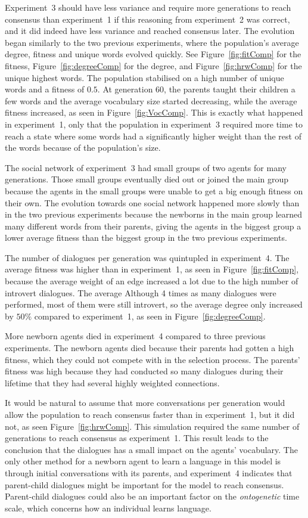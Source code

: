Experiment~3 should have less variance and require more generations to reach consensus than experiment~1 if this reasoning from experiment~2 was correct, and it did indeed have less variance and reached consensus later. The evolution began similarly to the two previous experiments, where the population's average degree, fitness and unique words evolved quickly. See Figure~\ref{fig:fitComp} for the fitness, Figure~\ref{fig:degreeComp} for the degree, and Figure~\ref{fig:hrwComp} for the unique highest words. The population stabilised on a high number of unique words and a fitness of $0.5$. At generation $60$, the parents taught their children a few words and the average vocabulary size started decreasing, while the average fitness increased, as seen in Figure~\ref{fig:VocComp}. This is exactly what happened in experiment~1, only that the population in experiment~3 required more time to reach a state where some words had a significantly higher weight than the rest of the words because of the population’s size. 

The social network of experiment~3 had small groups of two agents for many generations. Those small groups eventually died out or joined the main group because the agents in the small groups were unable to get a big enough fitness on their own. The evolution towards one social network happened more slowly than in the two previous experiments because the newborns in the main group learned many different words from their parents, giving the agents in the biggest group a lower average fitness than the biggest group in the two previous experiments.

The number of dialogues per generation was quintupled in experiment~4. The average fitness was higher than in experiment~1, as seen in Figure~\ref{fig:fitComp}, because the average weight of an edge increased a lot due to the high number of introvert dialogues. The average Although 4 times as many dialogues were performed, most of them were still introvert, so the average degree only increased by $50\%$ compared to experiment~1, as seen in Figure~\ref{fig:degreeComp}.

More newborn agents died in experiment~4 compared to three previous experiments. The newborn agents died because their parents had gotten a high fitness, which they could not compete with in the selection process. The parents' fitness was high because they had conducted so many dialogues during their lifetime that they had several highly weighted connections. 

It would be natural to assume that more conversations per generation would allow the population to reach consensus faster than in experiment~1, but it did not, as seen Figure~\ref{fig:hrwComp}. This simulation required the same number of generations to reach consensus as experiment~1. This result leads to the conclusion that the dialogues has a small impact on the agents' vocabulary. The only other method for a newborn agent to learn a language in this model is through initial conversations with its parents, and experiment~4 indicates that parent-child dialogues might be important for the model to reach consensus. Parent-child dialogues could also be an important factor on the \textit{ontogenetic} time scale, which concerns how an individual learns language.

